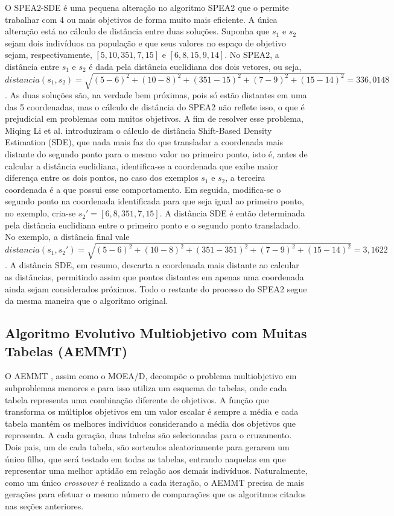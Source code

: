 O SPEA2-SDE \cite{Spea2SDE} é uma pequena alteração no algoritmo SPEA2 que o permite trabalhar com 4 ou mais objetivos de forma muito mais eficiente. A única alteração está no cálculo de distância entre duas soluções. Suponha que $s_1$ e $s_2$ sejam dois indivíduos na população e que seus valores no espaço de objetivo sejam, respectivamente, $[5, 10, 351, 7, 15]$ e $[6, 8, 15, 9, 14]$. No SPEA2, a distância entre $s_1$ e $s_2$ é dada pela distância euclidiana dos dois vetores, ou seja, $distancia(s_1, s_2) = \sqrt{(5-6)^2 + (10-8)^2 + (351-15)^2 + (7-9)^2 + (15-14)^2} = 336,0148$. As duas soluções são, na verdade bem próximas, pois só estão distantes em uma das 5 coordenadas, mas o cálculo de distância do SPEA2 não reflete isso, o que é prejudicial em problemas com muitos objetivos. A fim de resolver esse problema, Miqing Li et al. introduziram o cálculo de distância Shift-Based Density Estimation (SDE), que nada mais faz do que transladar a coordenada mais distante do segundo ponto para o mesmo valor no primeiro ponto, isto é, antes de calcular a distância euclidiana, identifica-se a coordenada que exibe maior diferença entre os dois pontos, no caso dos exemplos $s_1$ e $s_2$, a terceira coordenada é a que possui esse comportamento. Em seguida, modifica-se o segundo ponto na coordenada identificada para que seja igual ao primeiro ponto, no exemplo, cria-se $s_2' = [6, 8, 351, 7, 15]$. A distância SDE é então determinada pela distância euclidiana entre o primeiro ponto e o segundo ponto transladado. No exemplo, a distância final vale $distancia(s_1, s_2') = \sqrt{(5-6)^2 + (10-8)^2 + (351-351)^2 + (7-9)^2 + (15-14)^2} = 3,1622$. A distância SDE, em resumo, descarta a coordenada mais distante ao calcular as distâncias, permitindo assim que pontos distantes em apenas uma coordenada ainda sejam considerados próximos. Todo o restante do processo do SPEA2 segue da mesma maneira que o algoritmo original.

\subsection{Algoritmo Evolutivo Multiobjetivo com Muitas Tabelas (AEMMT)}

O AEMMT \cite{Brasil2013}, assim como o MOEA/D, decompõe o problema multiobjetivo em subproblemas menores e para isso utiliza um esquema de tabelas, onde cada tabela representa uma combinação diferente de objetivos. A função que transforma os múltiplos objetivos em um valor escalar é sempre a média e cada tabela mantém os melhores indivíduos considerando a média dos objetivos que representa. A cada geração, duas tabelas são selecionadas para o cruzamento. Dois pais, um de cada tabela, são sorteados aleatoriamente para gerarem um único filho, que será testado em todas as tabelas, entrando naquelas em que representar uma melhor aptidão em relação aos demais indivíduos. Naturalmente, como um único \textit{crossover} é realizado a cada iteração, o AEMMT precisa de mais gerações para efetuar o mesmo número de comparações que os algoritmos citados nas seções anteriores.

